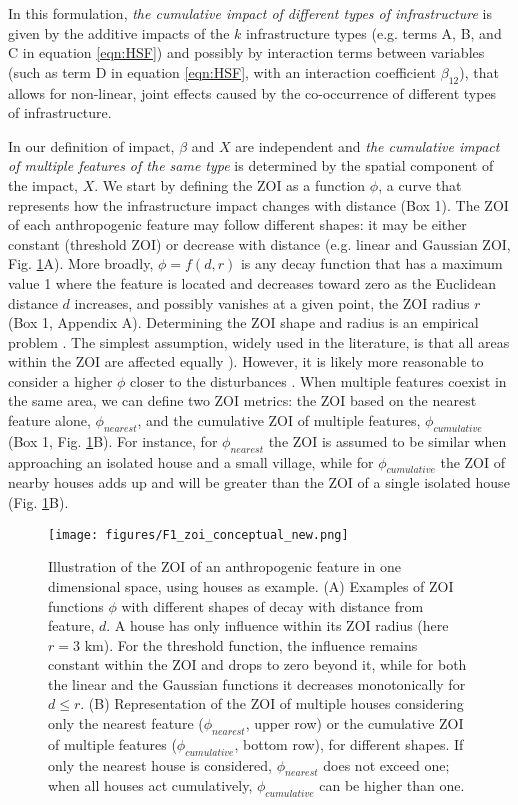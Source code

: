 \documentclass[titlepage]{article}
\begin{document}
In this formulation, \textit{the cumulative impact of different types of infrastructure} is given by the additive impacts of the $k$ infrastructure types (e.g. terms A, B, and C in equation \ref{eqn:HSF}) and possibly by interaction terms between variables (such as term D in equation \ref{eqn:HSF}, with an interaction coefficient $\beta_{12}$), that allows for non-linear, joint effects caused by the co-occurrence of different types of infrastructure. 

In our definition of impact, $\beta$ and $X$ are independent and \textit{the cumulative impact of multiple features of the same type} is determined by the spatial component of the impact, $X$. We start by defining the ZOI as a function $\phi$, a curve that represents how the infrastructure impact changes with distance (Box 1). The ZOI of each anthropogenic feature may follow different shapes: it may be either constant (threshold ZOI) or decrease with distance (e.g. linear and Gaussian ZOI, Fig. \ref{fig:ZOI_conceptual}A). More broadly, $\phi = f(d, r)$ is any decay function that has a maximum value 1 where the feature is located and decreases toward zero as the Euclidean distance $d$ increases, and possibly vanishes at a given point, the ZOI radius $r$ (Box 1, Appendix A). Determining the ZOI shape and radius is an empirical problem \citep{miguet_how_2017}. The simplest assumption, widely used in the literature, is that all areas within the ZOI are affected equally \citep[a buffer zone around features; e.g][]{panzacchi_learning_2013}). However, it is likely more reasonable to consider a higher $\phi$ closer to the disturbances \citep[][]{skarin_out_2018, zeller_multi-level_2017}. When multiple features coexist in the same area, we can define two ZOI metrics: the ZOI based on the nearest feature alone, $\phi_{nearest}$, and the cumulative ZOI of multiple features, $\phi_{cumulative}$ (Box 1, Fig. \ref{fig:ZOI_conceptual}B). For instance, for $\phi_{nearest}$ the ZOI is assumed to be similar when approaching an isolated house and a small village, while for $\phi_{cumulative}$ the ZOI of nearby houses adds up and will be greater than the ZOI of a single isolated house (Fig. \ref{fig:ZOI_conceptual}B).

\begin{figure}[!htbp]
\centering
\texttt{[image: figures/F1\_zoi\_conceptual\_new.png]}
\caption{\label{fig:ZOI_conceptual} Illustration of the ZOI of an anthropogenic feature in one dimensional space, using houses as example. (A) Examples of ZOI functions $\phi$ with different shapes of decay with distance from feature, $d$. A house has only influence within its ZOI radius (here $r = 3 \text{ km}$). For the threshold function, the influence remains constant within the ZOI and drops to zero beyond it, while for both the linear and the Gaussian functions it decreases monotonically for $d \leq r$. 
(B) Representation of the ZOI of multiple houses considering only the nearest feature ($\phi_{nearest}$, upper row) or the cumulative ZOI of multiple features ($\phi_{cumulative}$, bottom row), for different shapes. If only the nearest house is considered, $\phi_{nearest}$ does not exceed one; when all houses act cumulatively, $\phi_{cumulative}$ can be higher than one.}
\end{figure}
\end{document}
